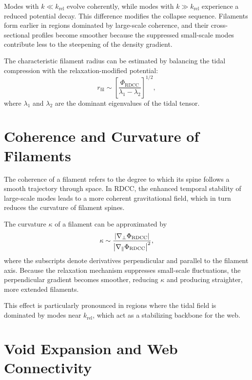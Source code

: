 \documentclass[11pt,a4paper]{article}
\begin{document}
Modes with $k \ll k_{\mathrm{rel}}$ evolve coherently, while modes with 
$k \gg k_{\mathrm{rel}}$ experience a reduced potential decay. This difference 
modifies the collapse sequence. Filaments form earlier in regions dominated by 
large-scale coherence, and their cross-sectional profiles become smoother because 
the suppressed small-scale modes contribute less to the steepening of the density 
gradient.

The characteristic filament radius can be estimated by balancing the tidal 
compression with the relaxation-modified potential:
\begin{equation}
    r_{\mathrm{fil}}
    \sim \left[
        \frac{\Phi_{\mathrm{RDCC}}}{\lambda_{1} - \lambda_{2}}
    \right]^{1/2},
\end{equation}
where $\lambda_{1}$ and $\lambda_{2}$ are the dominant eigenvalues of the tidal 
tensor.
\section{Coherence and Curvature of Filaments}

The coherence of a filament refers to the degree to which its spine follows a 
smooth trajectory through space. In RDCC, the enhanced temporal stability of 
large-scale modes leads to a more coherent gravitational field, which in turn 
reduces the curvature of filament spines.

The curvature $\kappa$ of a filament can be approximated by
\begin{equation}
    \kappa
    \sim \frac{\abs{\nabla_{\perp}\Phi_{\mathrm{RDCC}}}}{
        \abs{\nabla_{\parallel}\Phi_{\mathrm{RDCC}}}^{2}},
\end{equation}
where the subscripts denote derivatives perpendicular and parallel to the filament 
axis. Because the relaxation mechanism suppresses small-scale fluctuations, the 
perpendicular gradient becomes smoother, reducing $\kappa$ and producing straighter, 
more extended filaments.

This effect is particularly pronounced in regions where the tidal field is dominated 
by modes near $k_{\mathrm{rel}}$, which act as a stabilizing backbone for the web.
\section{Void Expansion and Web Connectivity}
\end{document}
